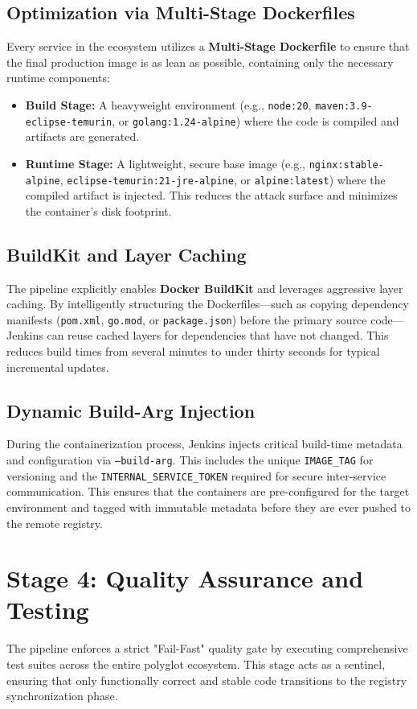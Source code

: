 \documentclass[12pt,a4paper]{report}
\begin{document}
\subsection{Optimization via Multi-Stage Dockerfiles}
Every service in the ecosystem utilizes a \textbf{Multi-Stage Dockerfile} to ensure that the final production image is as lean as possible, containing only the necessary runtime components:
\begin{itemize}
    \item \textbf{Build Stage:} A heavyweight environment (e.g., \texttt{node:20}, \texttt{maven:3.9-eclipse-temurin}, or \texttt{golang:1.24-alpine}) where the code is compiled and artifacts are generated.
    \item \textbf{Runtime Stage:} A lightweight, secure base image (e.g., \texttt{nginx:stable-alpine}, \texttt{eclipse-temurin:21-jre-alpine}, or \texttt{alpine:latest}) where the compiled artifact is injected. This reduces the attack surface and minimizes the container's disk footprint.
\end{itemize}

\subsection{BuildKit and Layer Caching}
The pipeline explicitly enables \textbf{Docker BuildKit} and leverages aggressive layer caching. By intelligently structuring the Dockerfiles---such as copying dependency manifests (\texttt{pom.xml}, \texttt{go.mod}, or \texttt{package.json}) before the primary source code---Jenkins can reuse cached layers for dependencies that have not changed. This reduces build times from several minutes to under thirty seconds for typical incremental updates.

\subsection{Dynamic Build-Arg Injection}
During the containerization process, Jenkins injects critical build-time metadata and configuration via \texttt{--build-arg}. This includes the unique \texttt{IMAGE\_TAG} for versioning and the \texttt{INTERNAL\_SERVICE\_TOKEN} required for secure inter-service communication. This ensures that the containers are pre-configured for the target environment and tagged with immutable metadata before they are ever pushed to the remote registry.

\section{Stage 4: Quality Assurance and Testing}
The pipeline enforces a strict "Fail-Fast" quality gate by executing comprehensive test suites across the entire polyglot ecosystem. This stage acts as a sentinel, ensuring that only functionally correct and stable code transitions to the registry synchronization phase.
\end{document}
